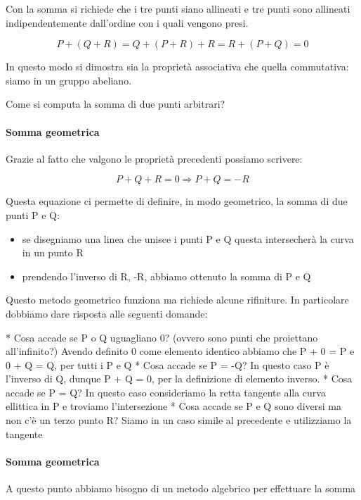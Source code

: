 \documentclass{book}
\theoremstyle{definition}
\begin{document}
Con la somma si richiede che i tre punti siano allineati e tre punti sono allineati indipendentemente dall'ordine con i quali vengono presi.

\[
    P + ( Q + R ) = Q + ( P + R ) + R = R + ( P + Q ) = 0
\]

In questo modo si dimostra sia la proprietà associativa che quella commutativa: siamo in un gruppo abeliano.

Come si computa la somma di due punti arbitrari?

\paragraph{Somma geometrica}

Grazie al fatto che valgono le proprietà precedenti possiamo scrivere:

\[
    P + Q + R = 0 \Rightarrow P + Q = -R
\]

Questa equazione ci permette di definire, in modo geometrico, la somma di due punti P e Q:

\begin{itemize}
    \item se disegniamo una linea che unisce i punti P e Q questa intersecherà la curva in un punto R
    \item prendendo l'inverso di R, -R, abbiamo ottenuto la somma di P e Q
\end{itemize}

Questo metodo geometrico funziona ma richiede alcune rifiniture. In particolare dobbiamo dare risposta alle seguenti domande:

* Cosa accade se P o Q uguagliano 0? (ovvero sono punti che proiettano all'infinito?) Avendo definito 0 come elemento identico abbiamo che P + 0 = P e 0 + Q = Q, per tutti i P e Q
* Cosa accade se P = -Q? In questo caso P è l'inverso di Q, dunque P + Q = 0, per la definizione di elemento inverso.
* Cosa accade se P = Q? In questo caso consideriamo la retta tangente alla curva ellittica in P e troviamo l'intersezione
* Cosa accade se P e Q sono diversi ma non c'è un terzo punto R? Siamo in un caso simile al precedente e utilizziamo la tangente

\paragraph{Somma geometrica}

A questo punto abbiamo bisogno di un metodo algebrico per effettuare la somma
\end{document}
